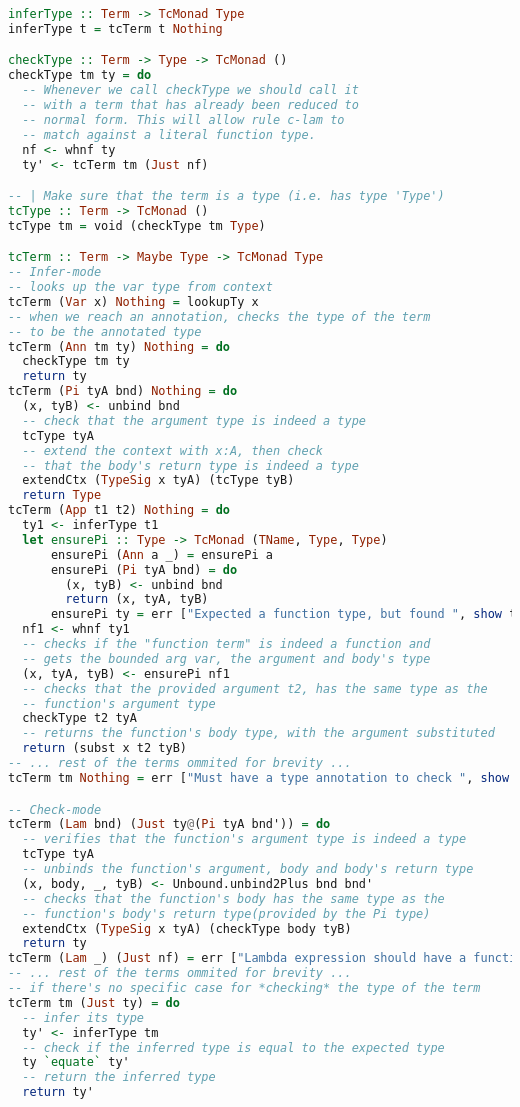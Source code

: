 \documentclass[
       embeddedlogo,
       english,
       lmodern,
       coorientadorbanca,
       noabntexcite
]{ufsc-thesis-rn46-2019}
\theoremstyle{definition}
\begin{document}
\begin{lstlisting}[language=Haskell]
inferType :: Term -> TcMonad Type
inferType t = tcTerm t Nothing

checkType :: Term -> Type -> TcMonad ()
checkType tm ty = do
  -- Whenever we call checkType we should call it
  -- with a term that has already been reduced to 
  -- normal form. This will allow rule c-lam to
  -- match against a literal function type.
  nf <- whnf ty
  ty' <- tcTerm tm (Just nf)

-- | Make sure that the term is a type (i.e. has type 'Type')
tcType :: Term -> TcMonad ()
tcType tm = void (checkType tm Type)

tcTerm :: Term -> Maybe Type -> TcMonad Type
-- Infer-mode
-- looks up the var type from context
tcTerm (Var x) Nothing = lookupTy x
-- when we reach an annotation, checks the type of the term
-- to be the annotated type
tcTerm (Ann tm ty) Nothing = do
  checkType tm ty
  return ty
tcTerm (Pi tyA bnd) Nothing = do
  (x, tyB) <- unbind bnd
  -- check that the argument type is indeed a type
  tcType tyA
  -- extend the context with x:A, then check
  -- that the body's return type is indeed a type
  extendCtx (TypeSig x tyA) (tcType tyB)
  return Type
tcTerm (App t1 t2) Nothing = do
  ty1 <- inferType t1
  let ensurePi :: Type -> TcMonad (TName, Type, Type)
      ensurePi (Ann a _) = ensurePi a
      ensurePi (Pi tyA bnd) = do
        (x, tyB) <- unbind bnd
        return (x, tyA, tyB)
      ensurePi ty = err ["Expected a function type, but found ", show ty]
  nf1 <- whnf ty1
  -- checks if the "function term" is indeed a function and
  -- gets the bounded arg var, the argument and body's type
  (x, tyA, tyB) <- ensurePi nf1
  -- checks that the provided argument t2, has the same type as the
  -- function's argument type
  checkType t2 tyA
  -- returns the function's body type, with the argument substituted
  return (subst x t2 tyB)
-- ... rest of the terms ommited for brevity ...
tcTerm tm Nothing = err ["Must have a type annotation to check ", show tm]

-- Check-mode
tcTerm (Lam bnd) (Just ty@(Pi tyA bnd')) = do
  -- verifies that the function's argument type is indeed a type
  tcType tyA
  -- unbinds the function's argument, body and body's return type
  (x, body, _, tyB) <- Unbound.unbind2Plus bnd bnd'
  -- checks that the function's body has the same type as the
  -- function's body's return type(provided by the Pi type)
  extendCtx (TypeSig x tyA) (checkType body tyB)
  return ty
tcTerm (Lam _) (Just nf) = err ["Lambda expression should have a function type, not", show nf]
-- ... rest of the terms ommited for brevity ...
-- if there's no specific case for *checking* the type of the term
tcTerm tm (Just ty) = do
  -- infer its type
  ty' <- inferType tm
  -- check if the inferred type is equal to the expected type
  ty `equate` ty'
  -- return the inferred type
  return ty'
\end{lstlisting}
\end{document}
